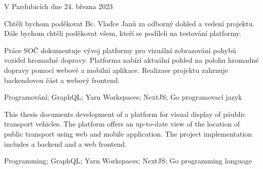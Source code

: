 \vspace{24 pt}

\noindent V Pardubicích dne 24. března 2023 \dotfill{}

\hspace{5.75cm} \authorName

\cleardoublepage

\vspace*{0.8\textheight}

\noindent
Chtěli bychom poděkovat Bc. Vlaďce Janů za odborný dohled a vedení projektu. %
Dále bychom chtěli poděkovat všem, kteří se podíleli na testování platformy.

\cleardoublepage


\noindent Práce SOČ dokumentuje vývoj platformy pro vizuální zobrazování pohybů vozidel hromadné dopravy. Platforma nabízí aktuální pohled na polohu hromadné dopravy pomocí webové a mobilní aplikace. Realizace projektu zahrnuje backendovou část a webový frontend.

\vspace{18pt}


\noindent Programování; GraphQL; Yarn Workspaces; NextJS; Go programovací jazyk
\vspace{18pt}


\noindent This thesis documents development of a platform for visual display of páublic transport vehicles. The platform offers an up-to-date view of the location of public transport using web and mobile application. The project implementation includes a backend and a web frontend.

\vspace{18pt}


\noindent Programming; GraphQL; Yarn Workspaces; NextJS; Go programming language

\cleardoublepage